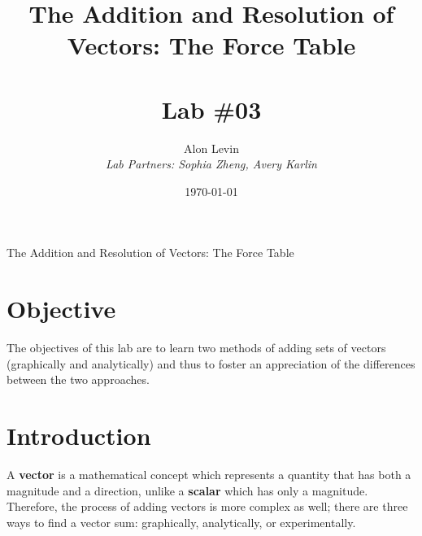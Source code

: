 \documentclass[11pt, titlepage]{article}
\title{\Huge{The Addition and Resolution of Vectors: The Force Table} \\ \ \\ \huge Lab \#03}
\author{\Large{Alon Levin} \\ \emph{Lab Partners: Sophia Zheng, Avery Karlin}}
\date{\today}
\begin{document}
\maketitle

\begin{center}
\LARGE The Addition and Resolution of Vectors: The Force Table
\end{center}

\section*{Objective}
The objectives of this lab are to learn two methods of adding sets of vectors (graphically and analytically) and thus to foster an appreciation of the differences between the two approaches.

\section*{Introduction}
A \textbf{vector} is a mathematical concept which represents a quantity that has both a magnitude and a direction, unlike a \textbf{scalar} which has only a magnitude. Therefore, the process of adding vectors is more complex as well; there are three ways to find a vector sum: graphically, analytically, or experimentally.
\end{document}
